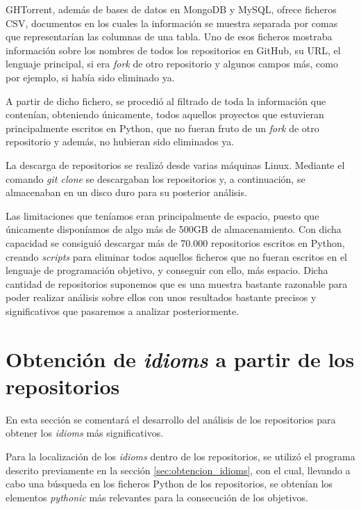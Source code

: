 \documentclass[a4paper, 12pt]{book}
\begin{document}
GHTorrent, además de bases de datos en MongoDB y MySQL, ofrece ficheros CSV, documentos en los cuales la información se muestra separada por comas que representarían las columnas de una tabla. Uno de esos ficheros mostraba información sobre los nombres de todos los repositorios en GitHub, su URL, el lenguaje principal, si era \textit{fork} de otro repositorio y algunos campos más, como por ejemplo, si había sido eliminado ya.

A partir de dicho fichero, se procedió al filtrado de toda la información que contenían, obteniendo únicamente, todos aquellos proyectos que estuvieran principalmente escritos en Python, que no fueran fruto de un \textit{fork} de otro repositorio y además, no hubieran sido eliminados ya.

La descarga de repositorios se realizó desde varias máquinas Linux. Mediante el comando \textit{git clone} se descargaban los repositorios y, a continuación, se almacenaban en un disco duro para su posterior análisis.

Las limitaciones que teníamos eran principalmente de espacio, puesto que únicamente disponíamos de algo más de 500GB de almacenamiento. Con dicha capacidad se consiguió descargar más de 70.000 repositorios escritos en Python, creando \textit{scripts} para eliminar todos aquellos ficheros que no fueran escritos en el lenguaje de programación objetivo, y conseguir con ello, más espacio. Dicha cantidad de repositorios suponemos que es una muestra bastante razonable para poder realizar análisis sobre ellos con unos resultados bastante precisos y significativos que pasaremos a analizar posteriormente.



\section{Obtención de \textit{idioms} a partir de los repositorios}
\label{sec:find_idioms_repos}

En esta sección se comentará el desarrollo del análisis de los repositorios para obtener los \textit{idioms} más significativos.

Para la localización de los \textit{idioms} dentro de los repositorios, se utilizó el programa descrito previamente en la sección \ref{sec:obtencion_idioms}, con el cual, llevando a cabo una búsqueda en los ficheros Python de los repositorios, se obtenían los elementos \textit{pythonic} más relevantes para la consecución de los objetivos.
\end{document}
